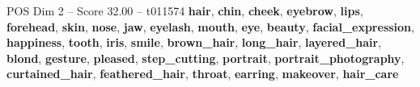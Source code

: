 \begin{textsample}{POS Dim 2 – Score 32.00 – t011574}  \label{ex:f2_pos_004}
\textbf{hair}, \textbf{chin}, \textbf{cheek}, \textbf{eyebrow}, \textbf{lips}, \textbf{forehead}, \textbf{skin}, \textbf{nose}, \textbf{jaw}, \textbf{eyelash}, \textbf{mouth}, \textbf{eye}, \textbf{beauty}, \textbf{facial\_expression}, \textbf{happiness}, \textbf{tooth}, \textbf{iris}, \textbf{smile}, \textbf{brown\_hair}, \textbf{long\_hair}, \textbf{layered\_hair}, \textbf{blond}, \textbf{gesture}, \textbf{pleased}, \textbf{step\_cutting}, \textbf{portrait}, \textbf{portrait\_photography}, \textbf{curtained\_hair}, \textbf{feathered\_hair}, \textbf{throat}, \textbf{earring}, \textbf{makeover}, \textbf{hair\_care}

\end{textsample}
